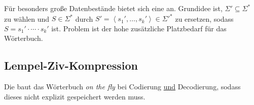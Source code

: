 Für besonders große Datenbestände bietet sich eine  an. Grundidee ist, \( \Sigma' \subseteq \Sigma^\ast \) zu wählen und \( S \in \Sigma^* \) durch  \( S' = \left\langle s_1', \dots, s_k' \right\rangle \in \Sigma'^\ast \)  zu ersetzen, sodass \( S = s_1' \cdot \cdots \cdot s_k' \) ist. Problem ist der hohe zusätzliche Platzbedarf für das Wörterbuch.

\subsection{Lempel-Ziv-Kompression}

Die  baut das Wörterbuch \emph{on the fly} bei Codierung \underline{und} Decodierung, sodass dieses nicht explizit gespeichert werden muss. \\


